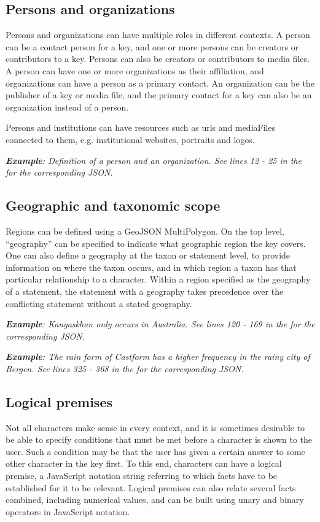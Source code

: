 \documentclass[10pt,letterpaper]{article}
\begin{document}
\subsection*{
Persons and organizations
}
Persons and organizations can have multiple roles in different contexts. A person can be a contact person for a key, and one or more persons can be creators or contributors to a key. Persons can also be creators or contributors to media files. A person can have one or more organizations as their affiliation, and organizations can have a person as a primary contact. An organization can be the publisher of a key or media file, and the primary contact for a key can also be an organization instead of a person.

Persons and institutions can have resources such as urls and mediaFiles connected to them, e.g. institutional websites, portraits and logos.


\textit{\textbf{Example}: Definition of a person and an organization. See lines 12 - 25 in the  for the corresponding JSON.}
\subsection*{
Geographic and taxonomic scope
}
Regions can be defined using a GeoJSON MultiPolygon. On the top level, ``geography'' can be specified to indicate what geographic region the key covers. One can also define a geography at the taxon or statement level, to provide information on where the taxon occurs, and in which region a taxon has that particular relationship to a character. Within a region specified as the geography of a statement, the statement with a geography takes precedence over the conflicting statement without a stated geography.


\textit{\textbf{Example}: Kangaskhan only occurs in Australia. See lines 120 - 169 in the  for the corresponding JSON.}


\textit{\textbf{Example}: The rain form of Castform has a higher frequency in the rainy city of Bergen. See lines 325 - 368 in the  for the corresponding JSON.}
\subsection*{
Logical premises
}
Not all characters make sense in every context, and it is sometimes desirable to be able to specify conditions that must be met before a character is shown to the user. Such a condition may be that the user has given a certain answer to some other character in the key first. To this end, characters can have a logical premise, a JavaScript notation string referring to which facts have to be established for it to be relevant. Logical premises can also relate several facts combined, including numerical values, and can be built using unary and binary operators in JavaScript notation.
\end{document}
